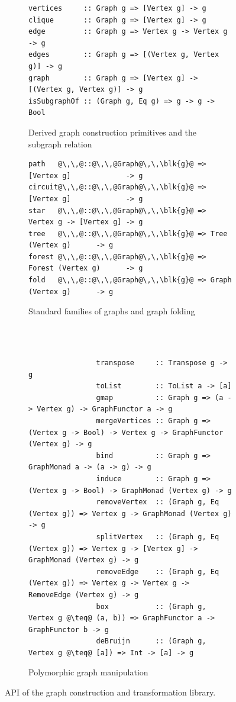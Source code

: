 \begin{figure}
\begin{subfigure}[b]{0.56\linewidth}
\begin{verbatim}
vertices     :: Graph g => [Vertex g] -> g
clique       :: Graph g => [Vertex g] -> g
edge         :: Graph g => Vertex g -> Vertex g -> g
edges        :: Graph g => [(Vertex g, Vertex g)] -> g
graph        :: Graph g => [Vertex g] -> [(Vertex g, Vertex g)] -> g
isSubgraphOf :: (Graph g, Eq g) => g -> g -> Bool
\end{verbatim}
\caption{Derived graph construction primitives and the subgraph relation}
\end{subfigure}
\hfill
\hfill
\vrule
\hfill
\hfill
\begin{subfigure}[b]{0.4\linewidth}
\begin{verbatim}
path   @\,\,@::@\,\,@Graph@\,\,\blk{g}@ => [Vertex g]             -> g
circuit@\,\,@::@\,\,@Graph@\,\,\blk{g}@ => [Vertex g]             -> g
star   @\,\,@::@\,\,@Graph@\,\,\blk{g}@ => Vertex g -> [Vertex g] -> g
tree   @\,\,@::@\,\,@Graph@\,\,\blk{g}@ => Tree   (Vertex g)      -> g
forest @\,\,@::@\,\,@Graph@\,\,\blk{g}@ => Forest (Vertex g)      -> g
fold   @\,\,@::@\,\,@Graph@\,\,\blk{g}@ => Graph  (Vertex g)      -> g
\end{verbatim}
\caption{Standard families of graphs and graph folding}
\end{subfigure}
~\\
~\\
\begin{subfigure}[b]{\linewidth}
\begin{verbatim}
                transpose     :: Transpose g -> g
                toList        :: ToList a -> [a]
                gmap          :: Graph g => (a -> Vertex g) -> GraphFunctor a -> g
                mergeVertices :: Graph g => (Vertex g -> Bool) -> Vertex g -> GraphFunctor (Vertex g) -> g
                bind          :: Graph g => GraphMonad a -> (a -> g) -> g
                induce        :: Graph g => (Vertex g -> Bool) -> GraphMonad (Vertex g) -> g
                removeVertex  :: (Graph g, Eq (Vertex g)) => Vertex g -> GraphMonad (Vertex g) -> g
                splitVertex   :: (Graph g, Eq (Vertex g)) => Vertex g -> [Vertex g] -> GraphMonad (Vertex g) -> g
                removeEdge    :: (Graph g, Eq (Vertex g)) => Vertex g -> Vertex g -> RemoveEdge (Vertex g) -> g
                box           :: (Graph g, Vertex g @\teq@ (a, b)) => GraphFunctor a -> GraphFunctor b -> g
                deBruijn      :: (Graph g, Vertex g @\teq@ [a]) => Int -> [a] -> g
\end{verbatim}
\caption{Polymorphic graph manipulation}
\end{subfigure}
\vspace{-4mm}
\caption{API of the graph construction and transformation library.\label{fig-api}}
\end{figure}


